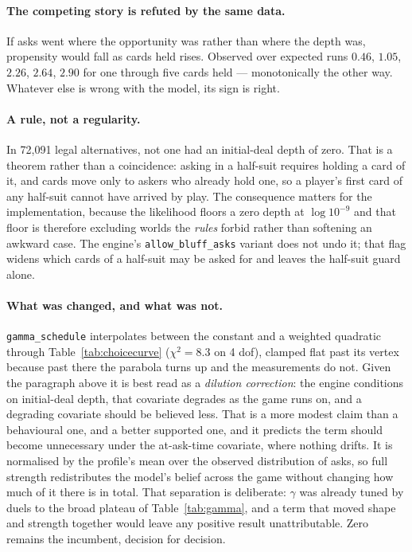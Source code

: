 \documentclass[11pt,letterpaper]{article}
\begin{document}
\paragraph{The competing story is refuted by the same data.} If asks went where
the opportunity was rather than where the depth was, propensity would fall as
cards held rises. Observed over expected runs $0.46$, $1.05$, $2.26$, $2.64$,
$2.90$ for one through five cards held --- monotonically the other way. Whatever
else is wrong with the model, its sign is right.

\paragraph{A rule, not a regularity.} In 72{,}091 legal alternatives, not one had
an initial-deal depth of zero. That is a theorem rather than a coincidence:
asking in a half-suit requires holding a card of it, and cards move only to
askers who already hold one, so a player's first card of any half-suit cannot
have arrived by play. The consequence matters for the implementation, because
the likelihood floors a zero depth at $\log 10^{-9}$ and that floor is therefore
excluding worlds the \emph{rules} forbid rather than softening an awkward case.
The engine's \texttt{allow\_bluff\_asks} variant does not undo it; that flag
widens which cards of a half-suit may be asked for and leaves the half-suit
guard alone.

\paragraph{What was changed, and what was not.} \texttt{gamma\_schedule}
interpolates between the constant and a weighted quadratic through
Table~\ref{tab:choicecurve} ($\chi^2 = 8.3$ on 4 dof), clamped flat past its
vertex because past there the parabola turns up and the measurements do not.
Given the paragraph above it is best read as a \emph{dilution correction}: the
engine conditions on initial-deal depth, that covariate degrades as the game
runs on, and a degrading covariate should be believed less. That is a more modest
claim than a behavioural one, and a better supported one, and it predicts the term should become unnecessary under the
at-ask-time covariate, where nothing drifts. It
is normalised by the profile's mean over the observed distribution of asks, so
full strength redistributes the model's belief across the game without changing
how much of it there is in total. That separation is deliberate: $\gamma$ was
already tuned by duels to the broad plateau of Table~\ref{tab:gamma}, and a term
that moved shape and strength together would leave any positive result
unattributable. Zero remains the incumbent, decision for decision.
\end{document}
